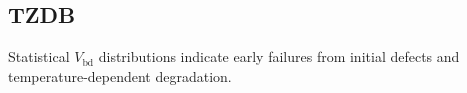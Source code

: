 \documentclass[conference]{IEEEtran}
\begin{document}
\subsection{TZDB}
Statistical \(V_{\mathrm{bd}}\) distributions indicate early failures from initial defects and temperature-dependent degradation.
\end{document}
